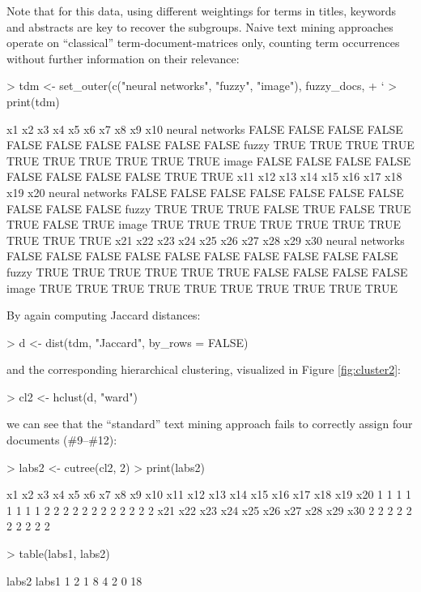 \documentclass[article]{jss}
\begin{document}
Note that for this data, using
different weightings for terms in titles, keywords and
abstracts are key to recover the subgroups.
Naive text mining approaches operate on ``classical''
term-document-matrices only, counting term occurrences without further
information on their relevance:
\begin{Schunk}
\begin{Sinput}
> tdm <- set_outer(c("neural networks", "fuzzy", "image"), fuzzy_docs, 
+     `%
> print(tdm)
\end{Sinput}
\begin{Soutput}
                   x1    x2    x3    x4    x5    x6    x7    x8    x9   x10
neural networks FALSE FALSE FALSE FALSE FALSE FALSE FALSE FALSE FALSE FALSE
fuzzy            TRUE  TRUE  TRUE  TRUE  TRUE  TRUE  TRUE  TRUE  TRUE  TRUE
image           FALSE FALSE FALSE FALSE FALSE FALSE FALSE FALSE  TRUE  TRUE
                  x11   x12   x13   x14   x15   x16   x17   x18   x19   x20
neural networks FALSE FALSE FALSE FALSE FALSE FALSE FALSE FALSE FALSE FALSE
fuzzy            TRUE  TRUE  TRUE FALSE  TRUE FALSE  TRUE  TRUE FALSE  TRUE
image            TRUE  TRUE  TRUE  TRUE  TRUE  TRUE  TRUE  TRUE  TRUE  TRUE
                  x21   x22   x23   x24   x25   x26   x27   x28   x29   x30
neural networks FALSE FALSE FALSE FALSE FALSE FALSE FALSE FALSE FALSE FALSE
fuzzy            TRUE  TRUE  TRUE  TRUE  TRUE  TRUE FALSE FALSE FALSE FALSE
image            TRUE  TRUE  TRUE  TRUE  TRUE  TRUE  TRUE  TRUE  TRUE  TRUE
\end{Soutput}
\end{Schunk}
By again computing Jaccard distances:
\begin{Schunk}
\begin{Sinput}
> d <- dist(tdm, "Jaccard", by_rows = FALSE)
\end{Sinput}
\end{Schunk}
and the corresponding hierarchical clustering,
visualized in Figure \ref{fig:cluster2}:
\begin{Schunk}
\begin{Sinput}
> cl2 <- hclust(d, "ward")
\end{Sinput}
\end{Schunk}
we can see that the ``standard'' text mining approach fails to
correctly assign four documents (\#9--\#12):
\begin{Schunk}
\begin{Sinput}
> labs2 <- cutree(cl2, 2)
> print(labs2)
\end{Sinput}
\begin{Soutput}
 x1  x2  x3  x4  x5  x6  x7  x8  x9 x10 x11 x12 x13 x14 x15 x16 x17 x18 x19 x20 
  1   1   1   1   1   1   1   1   2   2   2   2   2   2   2   2   2   2   2   2 
x21 x22 x23 x24 x25 x26 x27 x28 x29 x30 
  2   2   2   2   2   2   2   2   2   2 
\end{Soutput}
\begin{Sinput}
> table(labs1, labs2)
\end{Sinput}
\begin{Soutput}
     labs2
labs1  1  2
    1  8  4
    2  0 18
\end{Soutput}
\end{Schunk}
\end{document}
